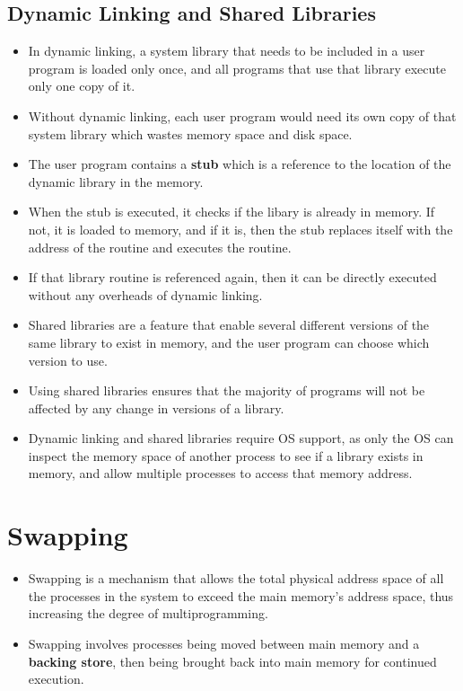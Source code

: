 \documentclass{article}
\theoremstyle{plain}
\theoremstyle{definition}
\begin{document}
\subsection{Dynamic Linking and Shared Libraries}
\begin{itemize}
    \item In dynamic linking, a system library that needs to be included in a user program is loaded only once, and all programs that use that library execute only one copy of it.
    
    \item Without dynamic linking, each user program would need its own copy of that system library which wastes memory space and disk space.
    
    \item The user program contains a \textbf{stub} which is a reference to the location of the dynamic library in the memory.
    
    \item When the stub is executed, it checks if the libary is already in memory. If not, it is loaded to memory, and if it is, then the stub replaces itself with the address of the routine and executes the routine. 
    
    \item If that library routine is referenced again, then it can be directly executed without any overheads of dynamic linking. 
    
    \item Shared libraries are a feature that enable several different versions of the same library to exist in memory, and the user program can choose which version to use. 
    
    \item Using shared libraries ensures that the majority of programs will not be affected by any change in versions of a library. 
    
    \item Dynamic linking and shared libraries require OS support, as only the OS can inspect the memory space of another process to see if a library exists in memory, and allow multiple processes to access that memory address. 
\end{itemize}

\section{Swapping}
\begin{itemize}
    \item Swapping is a mechanism that allows the total physical address space of all the processes in the system to exceed the main memory's address space, thus increasing the degree of multiprogramming.
    
    \item Swapping involves processes being moved between main memory and a \textbf{backing store}, then being brought back into main memory for continued execution.
\end{itemize}
\end{document}
